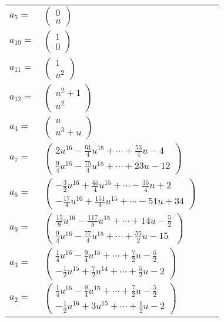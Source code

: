 \documentclass[1p]{elsarticle_modified}
\theoremstyle{definition}
\begin{document}
\begin{tabular}{m{7pt} m{180pt} m{7pt} m{180pt} }
\flushright $a_{5}=$&$\begin{pmatrix}0\\u\end{pmatrix}$ \\
\flushright $a_{10}=$&$\begin{pmatrix}1\\0\end{pmatrix}$ \\
\flushright $a_{11}=$&$\begin{pmatrix}1\\u^2\end{pmatrix}$ \\
\flushright $a_{12}=$&$\begin{pmatrix}u^2+1\\u^2\end{pmatrix}$ \\
\flushright $a_{4}=$&$\begin{pmatrix}u\\u^3+u\end{pmatrix}$ \\
\flushright $a_{7}=$&$\begin{pmatrix}2 u^{16}-\frac{61}{4} u^{15}+\cdots+\frac{53}{4} u-4\\\frac{9}{4} u^{16}-\frac{75}{4} u^{15}+\cdots+23 u-12\end{pmatrix}$ \\
\flushright $a_{6}=$&$\begin{pmatrix}-\frac{3}{2} u^{16}+\frac{45}{4} u^{15}+\cdots-\frac{35}{4} u+2\\-\frac{17}{4} u^{16}+\frac{151}{4} u^{15}+\cdots-51 u+34\end{pmatrix}$ \\
\flushright $a_{9}=$&$\begin{pmatrix}\frac{15}{8} u^{16}-\frac{117}{8} u^{15}+\cdots+14 u-\frac{5}{2}\\\frac{9}{4} u^{16}-\frac{77}{4} u^{15}+\cdots+\frac{55}{2} u-15\end{pmatrix}$ \\
\flushright $a_{3}=$&$\begin{pmatrix}\frac{1}{4} u^{16}-\frac{9}{4} u^{15}+\cdots+\frac{7}{2} u-\frac{5}{2}\\-\frac{1}{2} u^{15}+\frac{7}{2} u^{14}+\cdots+\frac{5}{2} u-2\end{pmatrix}$ \\
\flushright $a_{2}=$&$\begin{pmatrix}\frac{1}{4} u^{16}-\frac{9}{4} u^{15}+\cdots+\frac{7}{2} u-\frac{5}{2}\\-\frac{1}{2} u^{16}+3 u^{15}+\cdots+\frac{1}{2} u-2\end{pmatrix}$ \\

\end{tabular}
\end{document}
